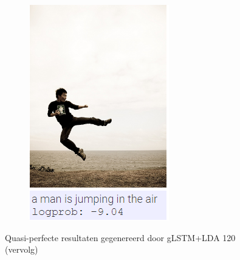 \begin{figure}
\begin{subfigure}{.5\textwidth}
				\includegraphics[width=.8\linewidth]{Images/Results/Perfect/jump}
				\label{fig:perfectresults8}
			\end{subfigure}	
			\caption{Quasi-perfecte resultaten gegenereerd door gLSTM+LDA 120 (vervolg)}
			\label{fig:perfectresults_2}
		\end{figure}



